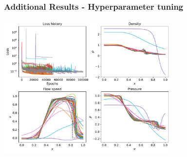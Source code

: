 \documentclass[aspectratio=169]{beamer}
\begin{document}
\begin{frame}\frametitle{Additional Results - Hyperparameter tuning}
	
	\begin{center}
		\includegraphics[width=0.68\textwidth]{Figures/Figure_13.pdf}
	\end{center}
	
\end{frame}
\end{document}
